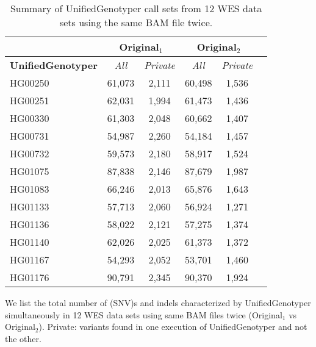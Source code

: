 \begin{table}[htb]
\caption{ Summary of UnifiedGenotyper call sets from 12 WES data sets using the same BAM file twice.}
\begin{center}
\begin{tabular}{|l||c|c|c|c|c|}
\hline
{\bf } & \multicolumn{2}{|c|}{Original$_1$} & \multicolumn{2}{|c|}{Original$_2$}\\
\hline
{\bf UnifiedGenotyper} & {\it All} & {\it Private} & {\it All} & {\it Private} \\
\hline
HG00250 & 61,073 & 2,111 & 60,498 & 1,536 \\
HG00251 & 62,031 & 1,994 & 61,473 & 1,436 \\
HG00330 & 61,303 & 2,048 & 60,662 & 1,407 \\
HG00731 & 54,987 & 2,260 & 54,184 & 1,457 \\
HG00732 & 59,573 & 2,180 & 58,917 & 1,524 \\
HG01075 & 87,838 & 2,146 & 87,679 & 1,987 \\
HG01083 & 66,246 & 2,013 & 65,876 & 1,643 \\
HG01133 & 57,713 & 2,060 & 56,924 & 1,271 \\
HG01136 & 58,022 & 2,121 & 57,275 & 1,374 \\
HG01140 & 62,026 & 2,025 & 61,373 & 1,372 \\
HG01167 & 54,293 & 2,052 & 53,701 & 1,460 \\
HG01176 & 90,791 & 2,345 & 90,370 & 1,924 \\
\hline
\end{tabular}
\end{center}
{\footnotesize We list the total number of (SNV)s and indels characterized by UnifiedGenotyper simultaneously in 12 WES data sets using same BAM files twice (Original$_1$ vs Original$_2$).
Private: variants found in one execution of UnifiedGenotyper and not the other.}
\label{supptab:orig-vs-orig2-multiple-ug}
\end{table}

